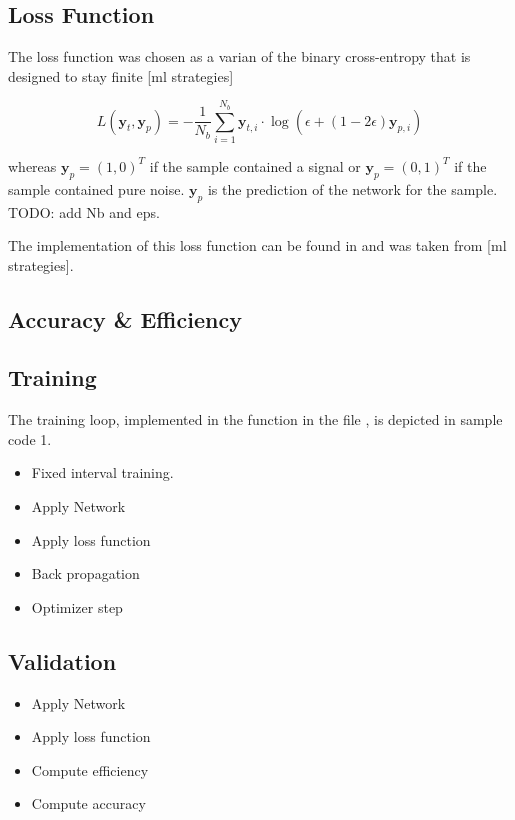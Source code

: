 \subsection{Loss Function}
The loss function was chosen as a varian of the binary cross-entropy that is
designed to stay finite [ml strategies]

\begin{equation}
  L(\mathbf{y}_t, \mathbf{y}_p) = -\frac{1}{N_b} \sum_{i=1}^{N_b}
  \mathbf{y}_{t,i} \cdot \log(\epsilon + (1 - 2\epsilon) \mathbf{y}_{p,i})
\end{equation}

whereas $\mathbf{y}_p = (1, 0)^T$ if the sample contained a signal or
$\mathbf{y}_p = (0, 1)^T$ if the sample contained pure noise. $\mathbf{y}_p$ is
the prediction of the network for the sample. TODO: add Nb and eps.

The implementation of this loss function can be found in
 and was taken from [ml strategies].

\subsection{Accuracy \& Efficiency}

\subsection{Training}
The training loop, implemented in the  function in the file
, is depicted in sample code 1.

\begin{itemize}
  \item Fixed interval training.
  \item Apply Network
  \item Apply loss function
  \item Back propagation
  \item Optimizer step
\end{itemize}

\subsection{Validation}
\begin{itemize}
  \item Apply Network
  \item Apply loss function
  \item Compute efficiency 
  \item Compute accuracy
\end{itemize}







